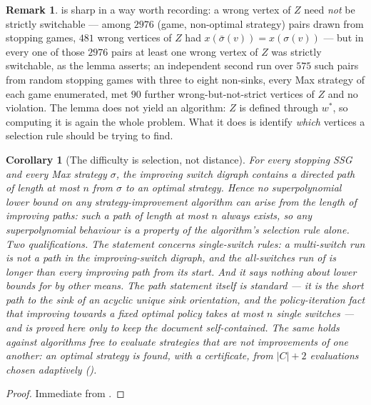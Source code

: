 \documentclass[11pt]{article}
\theoremstyle{plain}
\newtheorem{corollary}[theorem]{Corollary}
\theoremstyle{definition}
\newtheorem{remark}[theorem]{Remark}
\begin{document}
\begin{remark}
 is sharp in a way worth recording: a wrong vertex
of $Z$ need \emph{not} be strictly switchable --- among $2976$
(game, non-optimal strategy) pairs drawn from stopping games, $481$ wrong
vertices of $Z$ had $x(\bar\sigma(v))=x(\sigma(v))$ --- but in every one
of those $2976$ pairs at least one wrong vertex of $Z$ was strictly
switchable, as the lemma asserts; an independent second run over $575$
such pairs from random stopping games with three to eight non-sinks, every
Max strategy of each game enumerated, met $90$ further wrong-but-not-strict
vertices of $Z$ and no violation. The lemma does not yield an algorithm:
$Z$ is defined through $w^\ast$, so computing it is again the whole
problem. What it does is identify \emph{which} vertices a selection rule
should be trying to find.
\end{remark}

\begin{corollary}[The difficulty is selection, not distance]\label{cor:selection}
For every stopping SSG and every Max strategy $\sigma$, the improving
switch digraph contains a directed path of length at most $n$ from
$\sigma$ to an optimal strategy. Hence no superpolynomial lower bound on
any strategy-improvement algorithm can arise from the \emph{length} of
improving paths: such a path of length at most $n$ always exists, so any
superpolynomial behaviour is a property of the algorithm's
\emph{selection rule} alone. Two qualifications. The statement concerns
single-switch rules: a multi-switch run is not a path in the
improving-switch digraph, and the all-switches run of
 is longer than every improving path from
its start. And it says nothing about lower bounds for  by
other means. The path statement itself is standard --- it is the short
path to the sink of an acyclic unique sink orientation, and the
policy-iteration fact that improving towards a fixed optimal policy takes
at most $n$ single switches --- and is proved here only to keep the
document self-contained. The same holds against algorithms free to
evaluate strategies that are not improvements of one another: an
optimal strategy is found, with a certificate, from $|C|+2$ evaluations
chosen adaptively ().
\end{corollary}

\begin{proof}
Immediate from .
\end{proof}
\end{document}
